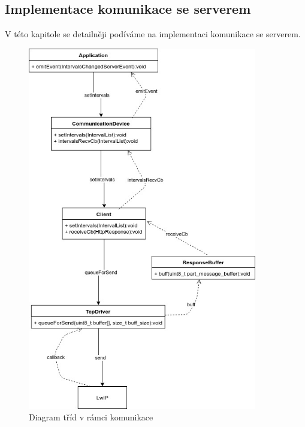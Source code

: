 
\subsection{Implementace komunikace se serverem}
V této kapitole se detailněji podíváme na implementaci komunikace se serverem.

\begin{figure}[tbh!]
\includegraphics[width=\textwidth, height=600px]{../diagrams/stm_implementace_komunikace.jpg}
\caption{Diagram tříd v rámci komunikace}
\label{stm-implementace-komunikace}
\end{figure}

